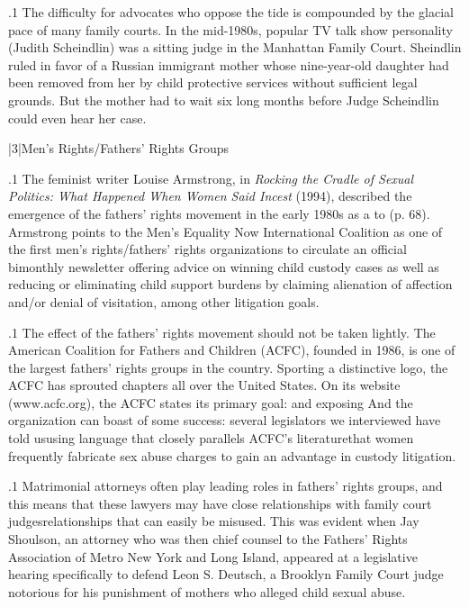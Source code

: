 \documentclass[11pt, twoside]{article}
\begin{document}
{\p.1{%
\:The difficulty for advocates who oppose the tide is compounded by
the glacial pace of many family courts. In the mid-1980s, popular TV
talk show personality  (Judith Scheindlin) was a sitting
judge in the Manhattan Family Court. Sheindlin ruled in favor of a
Russian immigrant mother whose nine-year-old daughter had been removed from her by child protective services without sufficient legal
grounds. But the mother had to wait six long months before Judge
Scheindlin could even hear her case.\;
}%


\s|3|{Men’s Rights/Fathers’ Rights Groups}

\p.1{%
\noindent{}\:The feminist writer Louise Armstrong, in \textit{Rocking the Cradle of Sexual
Politics: What Happened When Women Said Incest} (1994), described
the emergence of the fathers’ rights movement in the early 1980s as a
 to  (p. 68).
Armstrong points to the Men’s Equality Now International Coalition
as one of the first men’s rights/fathers’ rights organizations to circulate
an official bimonthly newsletter offering advice on winning child
custody cases as well as reducing or eliminating child support burdens by
claiming alienation of affection and/or denial of visitation, among other
litigation goals.\;
}%

\p.1{%
\:The effect of the fathers’ rights movement should not be taken lightly.
The American Coalition for Fathers and Children (ACFC), founded in
1986, is one of the largest fathers’ rights groups in the country. Sporting a distinctive logo, the ACFC has sprouted chapters all over the
United States. On its website (www.acfc.org), the ACFC states its primary goal:  and
exposing  And the organization can boast of some success: several legislators we interviewed
have told us\mdash{}using language that closely parallels ACFC’s
literature\mdash{}that women frequently fabricate sex abuse charges to gain an advantage
in custody litigation.\;
}%

\p.1{%
\:Matrimonial attorneys often play leading roles in fathers’ rights
groups, and this means that these lawyers may have close relationships
with family court judges\mdash{}relationships that can easily be misused. This
was evident when Jay Shoulson, an attorney who was then chief counsel
to the Fathers’ Rights Association of Metro New York and Long Island,
appeared at a legislative hearing specifically to defend Leon S. Deutsch,
a Brooklyn Family Court judge notorious for his punishment of mothers
who alleged child sexual abuse.\;
}%

}
\end{document}
